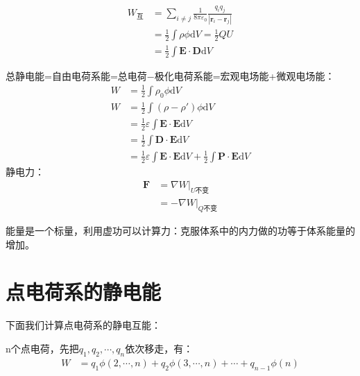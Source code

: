 \documentclass[12pt,onecolumn,a4paper]{book}
\newenvironment{block}[1]{
    \begin{tcolorbox}[colback=blue!5!white,colframe=blue!75!black,title=#1]
}{
    \end{tcolorbox}
}
\numberwithin{table}{subsection}
\numberwithin{equation}{subsection}
\begin{document}
\begin{block}{静电能}
    \begin{align}
        W_\text{互} & = \sum_{i\neq j} \frac{1}{8\pi\varepsilon_0} \frac{q_i q_j}{|\mathbf{r}_i-\mathbf{r}_j|} \\
                   & = \frac{1}{2} \int \rho \phi \mathrm{d} V = \frac{1}{2} QU                               \\
                   & = \frac{1}{2} \int \mathbf{E} \cdot \mathbf{D} \mathrm{d} V
    \end{align}

    总静电能=自由电荷系能=总电荷$-$极化电荷系能=宏观电场能+微观电场能：
    \begin{align}
        W & = \frac{1}{2} \int \rho_0 \phi \mathrm{d} V                                                                                         \\
        W & = \frac{1}{2} \int (\rho - \rho')\phi \mathrm{d} V                                                                                  \\
          & = \frac{1}{2} \varepsilon \int \mathbf{E} \cdot \mathbf{E} \mathrm{d} V                                                             \\
          & = \frac{1}{2} \int \mathbf{D} \cdot \mathbf{E} \mathrm{d} V                                                                         \\
          & = \frac{1}{2} \varepsilon \int \mathbf{E} \cdot \mathbf{E} \mathrm{d} V + \frac{1}{2} \int \mathbf{P} \cdot \mathbf{E} \mathrm{d} V
    \end{align}
    静电力：
    \begin{align}
        \mathbf{F} & = \nabla W |_\text{$U$不变}   \\
                   & = - \nabla W |_\text{$Q$不变}
    \end{align}
\end{block}

\newpage

能量是一个标量，利用虚功可以计算力：克服体系中的内力做的功等于体系能量的增加。

\section{点电荷系的静电能}

下面我们计算点电荷系的静电互能：

n个点电荷，先把$q_1,q_2,\cdots,q_n$依次移走，有：
\begin{align}
    W & = q_1 \phi(2,\cdots,n) + q_2 \phi(3,\cdots,n) + \cdots + q_{n-1} \phi(n)
\end{align}
\end{document}
